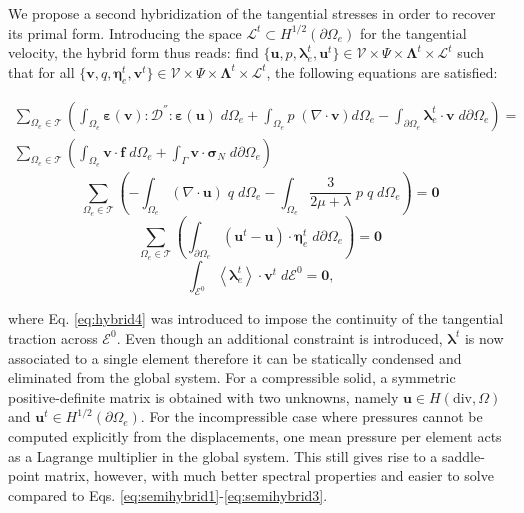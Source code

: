 \documentclass{wccm2024}
\begin{document}
We propose a second hybridization of the tangential stresses in order to recover its primal form. Introducing the space $\mathcal{L}^t \subset H^{1/2}(\partial\Omega_e)$ for the tangential velocity, the hybrid form thus reads: find $\{\mathbf{u},p,\boldsymbol{\lambda}^t_e,\mathbf{u}^t\} \in \mathcal{V} \times \Psi \times \boldsymbol{\Lambda}^t \times \mathcal{L}^t$ such that for all $\{\mathbf{v},q,\boldsymbol{\eta}^t_e,\mathbf{v}^t\} \in \mathcal{V} \times \Psi \times \boldsymbol{\Lambda}^t\times \mathcal{L}^t$, the following equations are satisfied:

\begin{equation} \label{eq:hybrid1}
    \begin{split}
        \sum_{\Omega_e \in \mathcal{T}} \left( \int_{\Omega_e} \boldsymbol{\varepsilon}(\mathbf{v}) : \mathcal{D}^{''} : \boldsymbol{\varepsilon}(\mathbf{u})\; d\Omega_e + \int_{\Omega_e} p \;(\nabla \cdot \mathbf{v}) d\Omega_e - \int_{\partial\Omega_e} \boldsymbol{\lambda}^t_e \cdot \mathbf{v}\; d\partial\Omega_e \right) = \\ \sum_{\Omega_e \in \mathcal{T}} \left( \int_{\Omega_e} \mathbf{v} \cdot \mathbf{f} \;d\Omega_e + \int_{\Gamma} \mathbf{v} \cdot \boldsymbol{\sigma}_N\; d\partial\Omega_e \right)
    \end{split}
\end{equation}
\begin{equation} \label{eq:hybrid2}
    \sum_{\Omega_e \in \mathcal{T}} \left(-\int_{\Omega_e} (\nabla \cdot \mathbf{u})\; q \;d\Omega_e -\int_{\Omega_e} \frac{3}{2\mu+\lambda}\;p \;q \;d\Omega_e \right) = \mathbf{0}
\end{equation}
\begin{equation} \label{eq:hybrid3}
    \sum_{\Omega_e \in \mathcal{T}} \left(\int_{\partial\Omega_e} (\mathbf{u}^t-\mathbf{u}) \cdot \boldsymbol{\eta}^t_e\; d\partial\Omega_e \right)  = \mathbf{0}
\end{equation}
\begin{equation} \label{eq:hybrid4}
     \int_{\mathcal{E}^0} \left\langle \boldsymbol{\lambda}^t_e \right\rangle \cdot \mathbf{v}^t\; d\mathcal{E}^0 = \mathbf{0} \text{,}
\end{equation}

\noindent where Eq. \eqref{eq:hybrid4} was introduced to impose the continuity of the tangential traction across $\mathcal{E}^0$. Even though an additional constraint is introduced, $\boldsymbol{\lambda}^t$ is now associated to a single element therefore it can be statically condensed and eliminated from the global system. For a compressible solid, a symmetric positive-definite matrix is obtained with two unknowns, namely $\mathbf{u} \in H(\text{div},\Omega)$ and $\mathbf{u}^t \in H^{1/2}(\partial\Omega_e)$. For the incompressible case where pressures cannot be computed explicitly from the displacements, one mean pressure per element acts as a Lagrange multiplier in the global system. This still gives rise to a saddle-point matrix, however, with much better spectral properties and easier to solve compared to Eqs. \eqref{eq:semihybrid1}-\eqref{eq:semihybrid3}.
\end{document}
